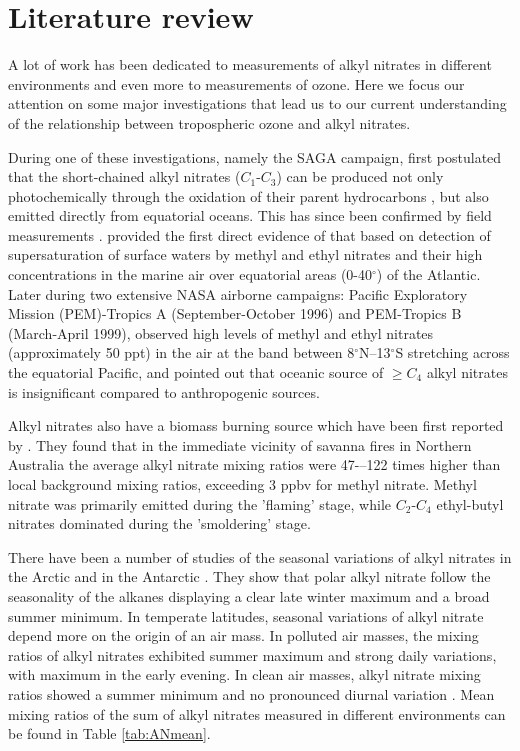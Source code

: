 \documentclass[11pt,a4paper]{article}
\begin{document}
\section{Literature review} \label{sec:lit_review}
A lot of work has been dedicated to measurements of alkyl nitrates in different environments and even more to measurements of ozone. Here we focus our attention on some major investigations that lead us to our current understanding of the relationship between tropospheric ozone and alkyl nitrates.

During one of these investigations, namely the SAGA campaign, \cite{Atlas1993} first postulated that the short-chained alkyl nitrates ($C_1$-$C_3$) can be produced not only photochemically through the oxidation of their parent hydrocarbons \citep{Roberts1990}, but also emitted directly from equatorial oceans. This has since been confirmed by field measurements \citep{Chuck2002,Blake2003,Dahl2005}. \cite{Chuck2002} provided the first direct evidence of that based on detection of supersaturation of surface waters by methyl and ethyl nitrates and their high concentrations in the marine air over equatorial areas (0-40$^{\circ}$) of the Atlantic. Later during two extensive NASA airborne campaigns: Pacific Exploratory Mission (PEM)-Tropics A (September-October 1996) and PEM-Tropics B (March-April 1999), \cite{Blake2003} observed high levels of methyl and ethyl nitrates (approximately 50 ppt) in the air at the band between 8$^{\circ}$N--13$^{\circ}$S stretching across the equatorial Pacific, and pointed out that oceanic source of $\geq C_4$ alkyl nitrates is insignificant compared to anthropogenic sources.

Alkyl nitrates also have a biomass burning source which have been first reported by \cite{Simpson2002}. They found that in the immediate vicinity of savanna fires in Northern Australia the average alkyl nitrate mixing ratios were 47-–122 times higher than local background mixing ratios, exceeding 3 ppbv for methyl nitrate. Methyl nitrate was primarily emitted during the 'flaming' stage, while $C_2$-$C_4$ ethyl-butyl nitrates dominated during the 'smoldering' stage.

There have been a number of studies of the seasonal variations of alkyl nitrates in the Arctic \citep{Swanson2003} and in the Antarctic \citep{Beyersdorf2010}. They show that polar alkyl nitrate follow the seasonality of the alkanes displaying a clear late winter maximum and a broad summer minimum. In temperate latitudes, seasonal variations of alkyl nitrate depend more on the origin of an air mass. In polluted air masses, the mixing ratios of alkyl nitrates exhibited summer maximum and strong daily variations, with maximum in the early evening. In clean air masses, alkyl nitrate mixing ratios showed a summer minimum and no pronounced diurnal variation \citep{Flocke1998}. Mean mixing ratios of the sum of alkyl nitrates measured in different environments can be found in Table \ref{tab:ANmean}.
\end{document}
